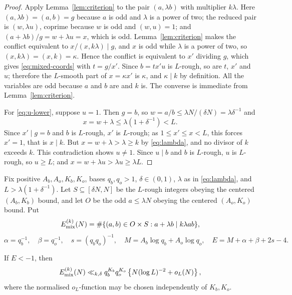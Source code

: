 \documentclass[11pt]{article}
\begin{document}
\begin{proof}
Apply Lemma~\ref{lem:criterion} to the pair \((a,\lambda b)\) with multiplier
\(k\lambda\). Here \((a,\lambda b)=(a,b)=g\) because \(a\) is odd and
\(\lambda\) is a power of two; the reduced pair is \((w,\lambda u)\), coprime
because \(w\) is odd and \((w,u)=1\); and \((a+\lambda b)/g=w+\lambda u=x\),
which is odd. Lemma~\ref{lem:criterion} makes the conflict equivalent to
\(x/(x,k\lambda)\mid g\), and \(x\) is odd while \(\lambda\) is a power of
two, so \((x,k\lambda)=(x,k)=\kappa\). Hence the conflict is equivalent
to \(x'\) dividing \(g\), which gives \eqref{eq:mixed-coords} with
\(t=g/x'\). Since \(b=tx'u\) is \(L\)-rough, so are \(t\), \(x'\) and \(u\);
therefore the \(L\)-smooth part of \(x=\kappa x'\) is \(\kappa\), and
\(\kappa\mid k\) by definition. All the variables are odd because \(a\) and
\(b\) are and \(k\) is. The converse is immediate from
Lemma~\ref{lem:criterion}.

For \eqref{eq:u-lower}, suppose \(u=1\). Then \(g=b\), so
\(w=a/b\leq\lambda N/(\delta N)=\lambda\delta^{-1}\) and
\[
 x=w+\lambda\leq\lambda(1+\delta^{-1})<L .
\]
Since \(x'\mid g=b\) and \(b\) is \(L\)-rough, \(x'\) is \(L\)-rough; as
\(1\leq x'\leq x<L\), this forces \(x'=1\), that is \(x\mid k\). But
\(x=w+\lambda>\lambda\geq k\) by \eqref{eq:lambda}, and no divisor of \(k\)
exceeds \(k\). This contradiction shows \(u\neq1\). Since \(u\mid b\) and
\(b\) is \(L\)-rough, \(u\) is \(L\)-rough, so \(u\geq L\); and
\(x=w+\lambda u>\lambda u\geq\lambda L\).
\end{proof}

Fix positive \(A_b,A_o,K_b,K_o\), bases \(q_b,q_o>1\), \(\delta\in(0,1)\),
\(\lambda\) as in \eqref{eq:lambda}, and \(L>\lambda(1+\delta^{-1})\). Let
\(S\subseteq[\delta N,N]\) be the \(L\)-rough integers obeying the centered
\((A_b,K_b)\) bound, and let \(O\) be the odd \(a\leq\lambda N\) obeying the
centered \((A_o,K_o)\) bound. Put
\[
 E^{(k)}_{\rm mix}(N)=\#\{(a,b)\in O\times S:a+\lambda b\mid k\lambda ab\},
\]
\[
 \alpha=q_b^{-1},\quad\beta=q_o^{-1},\quad s=(q_bq_o)^{-1},\quad
 M=A_b\log q_b+A_o\log q_o,\quad E=M+\alpha+\beta+2s-4 .
\]

\begin{proposition}\label{prop:mixed-estimate}
If \(E<-1\), then
\begin{equation}\label{eq:mixed-final}
 E^{(k)}_{\rm mix}(N)
 \ll_{k,\delta}q_b^{K_b}q_o^{K_o}\left\{N(\log L)^{-2}+o_L(N)\right\},
\end{equation}
where the normalised \(o_L\)-function may be chosen independently of
\(K_b,K_o\).
\end{proposition}
\end{document}
